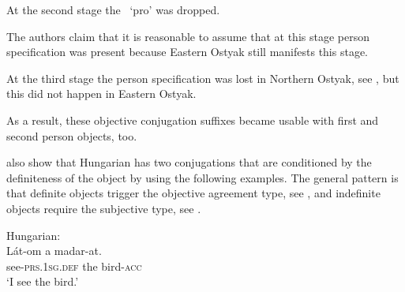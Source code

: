 \documentclass[output=paper,hidelinks]{langscibook}
\begin{document}
\ea%
    \label{ex:FinnoUgric:57}
    \z

At the second stage the \PRED\ `pro' was dropped.

\ea%
    \label{ex:FinnoUgric:58}
    \z
The authors claim that it is reasonable to assume that at this stage person specification was present because Eastern Ostyak still manifests this stage.

At the third stage the person specification was lost in Northern Ostyak, see , but this did not happen in Eastern Ostyak.


\ea%
    \label{ex:FinnoUgric:59}
\z
As a result, these objective conjugation suffixes became usable with first and second person objects, too.

\citet{CoppockWechsler2010} also show that Hungarian has two conjugations that are conditioned by the definiteness of the object by using the following examples. The general pattern is that definite objects trigger the objective agreement type, see , and indefinite objects require the subjective type, see .

\ea%
    \label{ex:FinnoUgric:60}Hungarian:\\
    \gll Lát-om a madar-at.\\
        see-\textsc{prs}.1\textsc{sg.def} the bird-\textsc{acc}\\
    \glt `I see the bird.'
    \z
\end{document}
